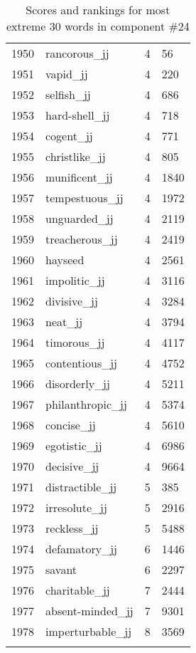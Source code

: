 \begin{longtable}[!htbp]{| rlr@{.}l |}
    1950 & rancorous\_jj & 4 & 56 \\
    1951 & vapid\_jj & 4 & 220 \\
    1952 & selfish\_jj & 4 & 686 \\
    1953 & hard-shell\_jj & 4 & 718 \\
    1954 & cogent\_jj & 4 & 771 \\
    1955 & christlike\_jj & 4 & 805 \\
    1956 & munificent\_jj & 4 & 1840 \\
    1957 & tempestuous\_jj & 4 & 1972 \\
    1958 & unguarded\_jj & 4 & 2119 \\
    1959 & treacherous\_jj & 4 & 2419 \\
    1960 & hayseed & 4 & 2561 \\
    1961 & impolitic\_jj & 4 & 3116 \\
    1962 & divisive\_jj & 4 & 3284 \\
    1963 & neat\_jj & 4 & 3794 \\
    1964 & timorous\_jj & 4 & 4117 \\
    1965 & contentious\_jj & 4 & 4752 \\
    1966 & disorderly\_jj & 4 & 5211 \\
    1967 & philanthropic\_jj & 4 & 5374 \\
    1968 & concise\_jj & 4 & 5610 \\
    1969 & egotistic\_jj & 4 & 6986 \\
    1970 & decisive\_jj & 4 & 9664 \\
    1971 & distractible\_jj & 5 & 385 \\
    1972 & irresolute\_jj & 5 & 2916 \\
    1973 & reckless\_jj & 5 & 5488 \\
    1974 & defamatory\_jj & 6 & 1446 \\
    1975 & savant & 6 & 2297 \\
    1976 & charitable\_jj & 7 & 2444 \\
    1977 & absent-minded\_jj & 7 & 9301 \\
    1978 & imperturbable\_jj & 8 & 3569 \\
    \hline
    \caption{Scores and rankings for most extreme 30 words in component \#24} \\
\end{longtable}
